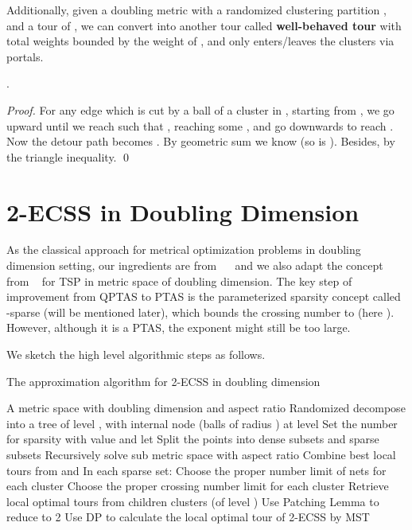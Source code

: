 \documentclass{llncs}
\begin{document}
Additionally, given a doubling metric  with a randomized clustering partition , and a tour  of , we can convert  into another tour  called \textbf{well-behaved tour} with total weights bounded by the weight of , and  only enters/leaves the clusters via portals.

\begin{lemma}
.
\end{lemma}

\begin{proof}
For any edge  which is cut by a ball of a cluster in , starting from , we go upward until we reach  such that , reaching some , and go downwards to reach .
Now the detour path becomes .
By geometric sum we know  (so is ).
Besides,  by the triangle inequality.
\qed
\end{proof}

\section{2-ECSS in Doubling Dimension}
\label{method}

As the classical approach for metrical optimization problems in doubling dimension setting, our ingredients are from ~\cite{Arora98}~\cite{Talwar04} and we also adapt the concept from ~\cite{Bartal12} for TSP in metric space of doubling dimension.
The key step of improvement from QPTAS to PTAS is the parameterized sparsity concept called -sparse (will be mentioned later), which bounds the crossing number to  (here ).
However, although it is a PTAS, the exponent might still be too large.

We sketch the high level algorithmic steps as follows.
\begin{algorithm}[htb]
  \caption{The approximation algorithm for 2-ECSS in doubling dimension}
  \label{alg:Framework}
  \begin{algorithmic}[1]
    \Require
      A metric space  with doubling dimension  and aspect ratio 
    \State Randomized decompose  into a tree of level ,
    \State with internal node (balls of radius ) at level 
    \State Set the number for sparsity  with value  and let 
    \State Split the points into dense subsets  and sparse subsets 
    \State Recursively solve sub metric space  with aspect ratio 
    \State Combine best local tours from  and 
    \EndIf
    \State In each sparse set:
    \State Choose the proper number limit  of nets for each cluster
    \State Choose the proper crossing number limit  for each cluster
    \State Retrieve local optimal tours  from children clusters (of level )
    \State Use Patching Lemma to reduce  to 2
    \State Use DP to calculate the local optimal tour of 2-ECSS by MST
    \EndFor
    \EndFor
  \end{algorithmic}
\end{algorithm}
\end{document}
